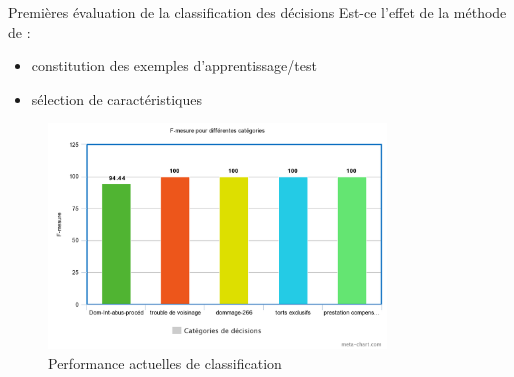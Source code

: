 \documentclass[newPxFont,pagenumber]{beamer}
\begin{document}
\begin{frame}{Premières évaluation de la classification des décisions}
\scriptsize
Est-ce l'effet de la méthode de :
\begin{itemize}
\item constitution des exemples d'apprentissage/test
\item sélection de caractéristiques
\end{itemize}
\begin{figure}
\includegraphics[width=0.8\textwidth]{f-mesure-classif.png}
\caption{Performance actuelles de classification}
\end{figure}
\end{frame}

%
%
\end{document}
